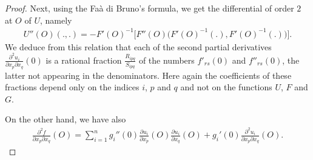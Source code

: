 \documentclass[10pt,a4paper]{amsart}
\numberwithin{equation}{section}
\begin{document}
\begin{proof}
	Next, using the Fa\`a di Bruno's formula, we get the differential of order $2$ at $O$ of $U$, namely
\begin{gather*}
U''(O)(.,.)=-F'(O)^{-1}\big[F''(O)\big(F'(O)^{-1}(.),F'(O)^{-1}(.)\big)\big].
\end{gather*}
	We deduce from this relation that each of the second partial derivatives $\frac{\partial^2u_i}{\partial x_p\partial x_q}(0)$ is a rational fraction $\frac{R_{ipq}}{S_{ipq}}$ of the numbers $f'_{rs}(0)$ and $f''_{rs}(0)$, the latter not appearing in the denominators. Here again the coefficients of these fractions depend only on the indices $i$, $p$ and $q$ and not on the functions $U$, $F$ and $G$.
	
	On the other hand, we have also
\begin{gather*}
\frac{\partial^2 f}{\partial x_p\partial x_q}(O)=\sum_{i=1}^{n}g_i''(0)\frac{\partial u_i}{\partial x_p}(O)\frac{\partial u_i}{\partial x_q}(O)+g_i'(0)\frac{\partial^2 u_i}{\partial x_p\partial x_q}(O).
\end{gather*}
	

\end{proof}
\end{document}
